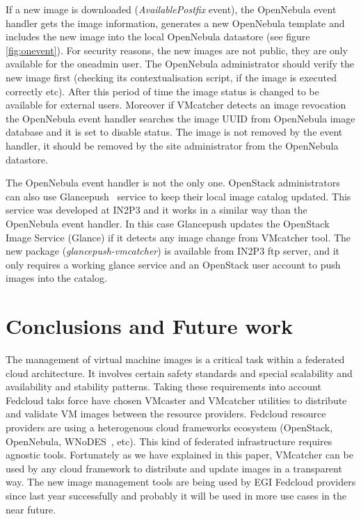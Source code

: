 \documentclass[oribibl]{llncs_Ibergrid2013}
\begin{document}
If a new image is downloaded (\textit{AvailablePostfix} event), the OpenNebula event handler gets the image information, generates a new OpenNebula template and includes the new image into the local OpenNebula datastore (see figure \ref{fig:onevent}). 
For security reasons, the new images are not public, they are only available for the oneadmin user. The OpenNebula administrator should verify the new image first (checking its contextualisation script, if the image is executed correctly etc).
After this period of time the image status is changed to be available for external users. 
Moreover if VMcatcher detects an image revocation the OpenNebula event handler searches the image UUID from OpenNebula image database and it is set to disable status.
The image is not removed by the event handler, it should be removed by the site administrator from the OpenNebula datastore.

The OpenNebula event handler is not the only one. OpenStack administrators can also use Glancepush~\cite{glancepush} service to keep their local image catalog updated. 
This service was developed at IN2P3 and it works in a similar way than the OpenNebula event handler. 
In this case Glancepush updates the OpenStack Image Service (Glance) if it detects any image change from VMcatcher tool. 
The new package (\textit{glancepush-vmcatcher}) is available from IN2P3 ftp server, and it only requires a working glance service and an OpenStack user account to push images into the catalog.


\section{Conclusions and Future work}
\label{sect-conclusions}
The management of virtual machine images is a critical task within a federated cloud architecture. It involves certain safety standards and special scalability and availability and stability patterns.
Taking these requirements into account Fedcloud taks force have chosen VMcaster and VMcatcher utilities to distribute and validate VM images between the resource providers.
Fedcloud resource providers are using a heterogenous cloud frameworks ecosystem (OpenStack, OpenNebula, WNoDES~\cite{wnodes}, etc). This kind of federated infrastructure requires agnostic tools.
Fortunately as we have explained in this paper, VMcatcher can be used by any cloud framework to distribute and update images in a transparent way. 
The new image management tools are being used by EGI Fedcloud providers since last year successfully and probably it will be used in more use cases in the near future.
\end{document}
